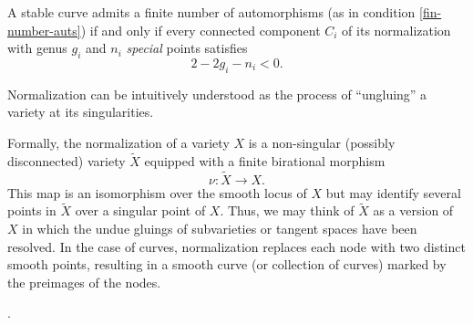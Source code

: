 \documentclass[12pt]{memoir}
\begin{document}
\begin{Th}
A stable curve admits a finite number of automorphisms (as in condition \ref{fin-number-auts}) if and only if every connected component $C_i$ of its normalization with genus $g_i$ and $n_i$ \emph{special} points satisfies 
$$2-2g_i-n_i<0.$$
\end{Th}

\begin{Rmk} 
Normalization can be intuitively understood as the process of ``ungluing'' a variety at its singularities.\par
Formally, the normalization of a variety $X$ is a non-singular (possibly disconnected) variety $\widetilde X$ equipped with a finite birational morphism 
$$\nu:\widetilde X\to X.$$
This map is an isomorphism over the smooth locus of $X$ but may identify several points in $\widetilde X$ over a singular point of $X$. Thus, we may think of $\widetilde X$ as a version of $X$ in which the undue gluings of subvarieties or tangent spaces have been resolved. In the case of curves, normalization replaces each node with two distinct smooth points, resulting in a smooth curve (or collection of curves) marked by the preimages of the nodes. 
\end{Rmk}

\begin{center}
    .
\end{center}

\iffalse
\begin{ptcb}
    Idea should go like: if $C$ has $k$ irreducible components, then we may add up the contributions as follows:
    \begin{align*}
    \forall i(2-2g_i-n_i<0)&\To\sum_{i=1}^k(2-2g_i-2n_i)<0\\
    &\To2k-2\sum_{i=1}^k g_i-2\sum_{i=1}^k n_i<0.
    \end{align*}
    Observe that $g$ can be larger than $\sum_{i=1}^k g_i$ as we can add arithmetic genus when joining two different points on a component. Observe that the sum $\sum_{i=1}^k n_i$ accounts for the marks and nodes-to-be in the component $C_i$. All marks in the normalization arise from a mark in the original curve and every node in the original curve is counted \emph{twice} in the sum by the handshaking lemma. This means that 
    $$\sum_{i=1}^k n_i=n+2(\#\text{nodes in }C).$$
    Thus our quantity becomes 
    $$2k-2\sum_{i=1}^kg_i-2n-4(\#\text{nodes in }C).$$
    \red{¿How do we get to the final quantity?}
\end{ptcb}
\fi
\end{document}
